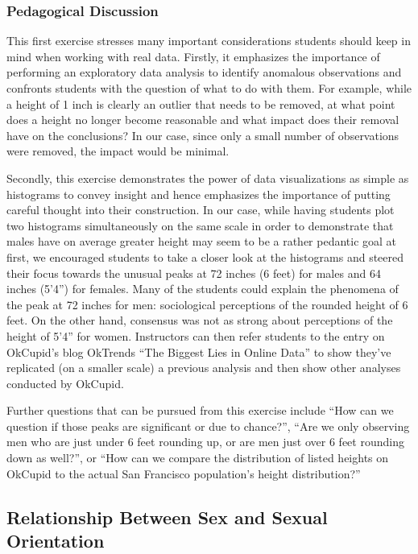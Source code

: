 \documentclass{article}\usepackage[]{graphicx}\usepackage[]{color}
\begin{document}
\subsubsection{Pedagogical Discussion}
This first exercise stresses many important considerations students should keep in mind when working with real data.  Firstly, it emphasizes the importance of performing an exploratory data analysis to identify anomalous observations and confronts students with the question of what to do with them.  For example, while a height of 1 inch is clearly an outlier that needs to be removed, at what point does a height no longer become reasonable and what impact does their removal have on the conclusions?  In our case, since only a small number of observations were removed, the impact would be minimal.

Secondly, this exercise demonstrates the power of data visualizations as simple as histograms to convey insight and hence emphasizes the importance of putting careful thought into their construction.  In our case, while having students plot two histograms simultaneously on the same scale in order to demonstrate that males have on average greater height may seem to be a rather pedantic goal at first, we encouraged students to take a closer look at the histograms and steered their focus towards the unusual peaks at 72 inches (6 feet) for males and 64 inches (5'4'') for females.  Many of the students could explain the phenomena of the peak at 72 inches for men: sociological perceptions of the rounded height of 6 feet.  On the other hand, consensus was not as strong about perceptions of the height of 5'4'' for women.  Instructors can then refer students to the entry on OkCupid's blog OkTrends ``The Biggest Lies in Online Data''\cite{OkTrendsLies} to show they've replicated (on a smaller scale) a previous analysis and then show other analyses conducted by OkCupid.

Further questions that can be pursued from this exercise include ``How can we question if those peaks are significant or due to chance?'', ``Are we only observing men who are just under 6 feet rounding up, or are men just over 6 feet rounding down as well?'', or ``How can we compare the distribution of listed heights on OkCupid to the actual San Francisco population's height distribution?''







\subsection{Relationship Between Sex and Sexual Orientation}\label{sex_by_sexual_orientation}
\end{document}
